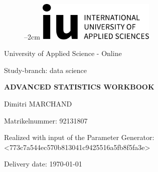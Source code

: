 
\label{titlePage}
\begin{figure}[h]
\centering
\advance\leftskip--2cm
\includegraphics[width=0.50\textwidth]{logo.pdf}
\end{figure}
\FloatBarrier


\vspace*{5mm}

\begin{large} 
\begin{center}
University of Applied Science - Online
\end{center}
\end{large} 

\begin{large} 
\begin{center}
Study-branch: data science
\end{center}
\end{large}

\vspace*{15mm}

\begin{Large} 
\begin{center}
\textbf{ADVANCED STATISTICS WORKBOOK}
\end{center}
\end{Large}

\vspace*{15mm}

\begin{large} 
\begin{center}
Dimitri MARCHAND
\end{center}
\end{large} 

\vspace*{-6mm}

\begin{large} 
\begin{center}
Matrikelnummer: 92131807
\end{center}
\end{large} 





\begin{large} 
\begin{center}
Realized with input of the Parameter Generator: <773c7a544ec570b813041c9425516a5fb8f5fa3e>
\end{center}
\end{large} 



\vspace*{-6mm}

\begin{large} 
\begin{center}
Delivery date: \today
\end{center}
\end{large} 


\pagestyle{empty} %

